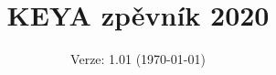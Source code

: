 \documentclass[twoside,12pt,a5paper]{article}
\title{KEYA zpěvník 2020}
\date{Verze: 1.01 (\today)}
\begin{document}
\maketitle
\cleardoublepage
\begin{multicols}{2}
\begin{footnotesize}
\tableofcontents{}
\end{footnotesize}
\end{multicols}
\clearpage

\end{document}
